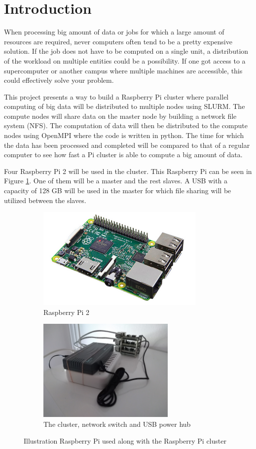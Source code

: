 \documentclass[../Head/Report.tex]{subfiles}
\begin{document}
\section{Introduction}
When processing big amount of data or jobs for which a large amount of resources are required, never computers often tend to be a pretty expensive solution. If the job does not have to be computed on a single unit, a distribution of the workload on multiple entities could be a possibility. If one got access to a supercomputer or another campus where multiple machines are accessible, this could effectively solve your problem.

This project presents a way to build a Raspberry Pi cluster where parallel computing of big data will be distributed to multiple nodes using SLURM. The compute nodes will share data on the master node by building a network file system (NFS). The computation of data will then be distributed to the compute nodes using OpenMPI where the code is written in python. The time for which the data has been processed and completed will be compared to that of a regular computer to see how fast a Pi cluster is able to compute a big amount of data.

Four Raspberry Pi 2 will be used in the cluster. This Raspberry Pi can be seen in Figure \ref{fig:raspberry_pi}. One of them will be a master and the rest slaves. A USB with a capacity of 128 GB will be used in the master for which file sharing will be utilized between the slaves.  

\begin{figure}[H]
\centering
  \begin{subfigure}[b]{0.48\textwidth}
  \centering
    \includegraphics[height=5cm]{../Figures/raspberry_pi.png}
    \caption{Raspberry Pi 2}
    \label{fig:raspberry_pi}
  \end{subfigure}
  \hfill
  \begin{subfigure}[b]{0.48\textwidth}
  \centering
    \includegraphics[height=5cm]{../Figures/cluster.jpg}
    \caption{The cluster, network switch and USB power hub}
    \label{fig:cluster}
  \end{subfigure}
  \caption{Illustration Raspberry Pi used along with the Raspberry Pi cluster }
\end{figure}
    
\end{document}
